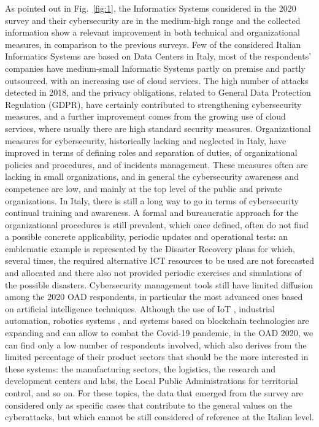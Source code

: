 \documentclass{easychair}
\begin{document}
As pointed out in Fig.~\ref{fig:1}, the Informatics Systems considered in the 2020 survey and their cybersecurity  are in the medium-high range and the collected information show a relevant 
improvement in both technical and organizational measures, in comparison to the previous surveys. Few of the considered Italian Informatics Systems are based on Data Centers in 
Italy, most of the respondents’ companies have medium-small Informatic Systems partly on premise and partly outsourced, with an increasing use of cloud services.
The high number of attacks detected in 2018, and the privacy obligations, related to General Data Protection Regulation (GDPR), have certainly contributed to strengthening cybersecurity measures, and a further improvement 
comes from the growing use of cloud services, where usually there are high standard security measures. Organizational measures for cybersecurity, historically lacking and neglected
in Italy, have improved in terms of defining roles and separation of duties, of organizational policies and procedures, and of incidents management. These measures often are lacking
in small organizations, and in general the cybersecurity awareness and competence are low, and mainly at the top level of the public and private organizations. In Italy, there is 
still a long way to go in terms of cybersecurity continual training and awareness. A formal and bureaucratic approach for the organizational procedures is still prevalent, which 
once defined, often do not find a possible concrete applicability, periodic updates and operational tests: an emblematic example is represented by the Disaster Recovery plans for 
which, several times, the required alternative ICT resources to be used are not forecasted and allocated and there also not provided periodic exercises and simulations of the 
possible disasters. Cybersecurity management tools still have limited diffusion among the 2020 OAD respondents, in particular the most advanced ones based on artificial intelligence
techniques. Although the use of IoT \cite{JK21}, industrial automation, robotics systems \cite{SGLMDXHKCZT21}, and systems based on blockchain technologies \cite{RMFF21} are expanding and can allow to combat the Covid-19 pandemic, in 
the OAD 2020, we can find only a low number of respondents involved, which also derives from the limited percentage of their product sectors that should be the more interested in these systems: the manufacturing sectors, the logistics, the research and 
development centers and labs, the Local Public Administrations for territorial control, and so on. For these topics, the data that emerged from the survey are considered only as 
specific cases that contribute to the general values on the cyberattacks, but which cannot be still considered of reference at the Italian level.
\end{document}
